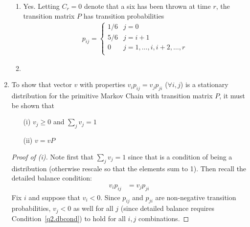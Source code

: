\documentclass[12pt]{article}
\theoremstyle{plain}
\theoremstyle{definition}
\theoremstyle{remark}
\begin{document}
\begin{enumerate}
\begin{enumerate}
  \item %
    Yes. Letting $C_r=0$ denote that a six has been thrown at time $r$,
    the transition matrix $P$ has transition probabilities
    \begin{align*}
      p_{ij} = 
        \begin{cases}
          1/6 & j=0\\
          5/6 & j=i+1\\
          0 & j=1,\ldots,i,i+2,\ldots,r\\
        \end{cases}
    \end{align*}

  \item %
\end{enumerate} %

\item %
  To show that vector $v$ with properties $v_ip_{ij}=v_jp_{ji}$
  ($\forall i,j$) is a stationary distribution for the primitive Markov
  Chain with transition matrix $P$, it must be shown that
  \begin{enumerate}
    \item[(i)] $v_j \geq 0$ and $\sum_j v_j=1$
    \item[(ii)] $v = vP$
  \end{enumerate}
  \begin{proof}[Proof of (i)]
  Note first that $\sum_j v_j = 1$ since that is a condition of being a
  distribution (otherwise rescale so that the elements sum to 1). Then
  recall the detailed balance condition:
  \begin{align}
    \label{q2.dbcond}
    v_i p_{ij} &= v_j p_{ji}
  \end{align}
  Fix $i$ and suppose that $v_i < 0$. Since $p_{ij}$ and $p_{ji}$ are
  non-negative transition probabilities, $v_j < 0$ as well for all $j$
  (since detailed balance requires Condition~\ref{q2.dbcond}) to hold
  for all $i,j$ combinations.


\end{proof}
\end{enumerate}
\end{document}
